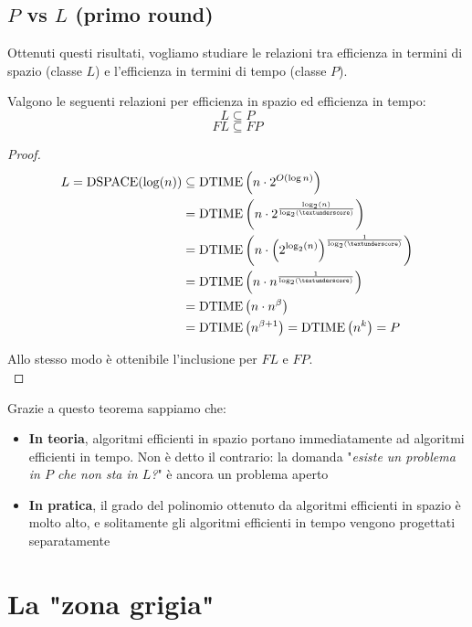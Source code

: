 \subsection{$P$ vs $L$ (primo round)}

Ottenuti questi risultati, vogliamo studiare le relazioni tra efficienza in termini di spazio (classe $L$) e l'efficienza in termini di tempo (classe $P$).\\

\begin{theor}
	Valgono le seguenti relazioni per efficienza in spazio ed efficienza in tempo:
	$$ L \subseteq P $$
	$$ FL \subseteq FP $$
\end{theor}
\begin{proof}
	\begin{align*}
		L = \dspace (\log (n)) & \subseteq \dtime \left(n \cdot 2^{O(\log n)}\right) \\
		& = \dtime \left(n \cdot 2^{\frac{\log_2 (n)}{\log_2 (\textunderscore)}}\right) \\
		& = \dtime \left(n \cdot \left(2^{\log_2 (n)}\right)^{\frac{1}{\log_2 (\textunderscore)}}\right) \\
		& = \dtime \left(n \cdot n^{\frac{1}{\log_2 (\textunderscore)}}\right) \\
		& = \dtime \left(n \cdot n^\beta \right) \\
		& = \dtime \left(n^{\beta + 1}\right) = \dtime\left(n^k\right) = P
	\end{align*}
	
	Allo stesso modo è ottenibile l'inclusione per $FL$ e $FP$.\\
\end{proof}

Grazie a questo teorema sappiamo che:
\begin{itemize}
	\item \textbf{In teoria}, algoritmi efficienti in spazio portano immediatamente ad algoritmi efficienti in tempo. Non è detto il contrario: la domanda "\textit{esiste un problema in $P$ che non sta in $L$?}" è ancora un problema aperto
    
	\item \textbf{In pratica}, il grado del polinomio ottenuto da algoritmi efficienti in spazio è molto alto, e solitamente gli algoritmi efficienti in tempo vengono progettati separatamente
\end{itemize}

\section{La "zona grigia"}

